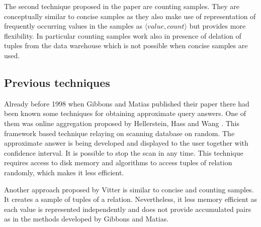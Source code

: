 The second technique proposed in the paper \cite{GM98} are
counting samples. They are conceptually similar to concise
samples as they also make use of representation of frequently
occurring values in the samples as $\langle value, count \rangle$ but
provides more flexibility. In particular counting samples work also in
presence of delation of tuples from the data warehouse which is not
possible when concise samples are used.

\subsection{Previous techniques}
Already before 1998 when Gibbons and Matias published their paper
there had been known some techniques for obtaining
approximate query answers. One of them was online aggregation
proposed by Hellerstein, Hass and Wang \cite{HHW97}. This
framework based technique relaying on scanning database on random.
The approximate answer is being developed
and displayed to the user together with confidence interval. It is
possible to stop the scan in any time. This technique requires access
to disk memory and algorithms to access tuples of
relation randomly, which makes it less efficient.

Another approach proposed by Vitter \cite{Vit85} is
similar to concise and counting samples. It creates a sample of tuples
of a relation. Nevertheless, it less memory efficient as each value is
represented independently and does not provide accumulated pairs as
in the methods developed by Gibbons and Matias.

